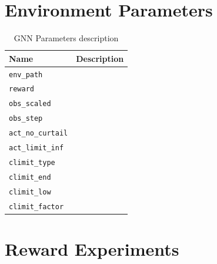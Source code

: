 \section{Environment Parameters}

\begin{table}[ht!]
	\centering
	\caption{\ac{GNN} Parameters description}
	\begin{tabular}{lp{8cm}}
		\toprule
		\textbf{Name} & \textbf{Description} \\
		\midrule
		\texttt{env\_path} & \\
		\texttt{reward} & \\
		\texttt{obs\_scaled} & \\
		\texttt{obs\_step} & \\
		\texttt{act\_no\_curtail} & \\
		\texttt{act\_limit\_inf} & \\
		\texttt{climit\_type} & \\
		\texttt{climit\_end} & \\
		\texttt{climit\_low} & \\
		\texttt{climit\_factor} & \\
		\bottomrule
	\end{tabular}
	\label{tab:env-params}
\end{table}

\section{Reward Experiments}

